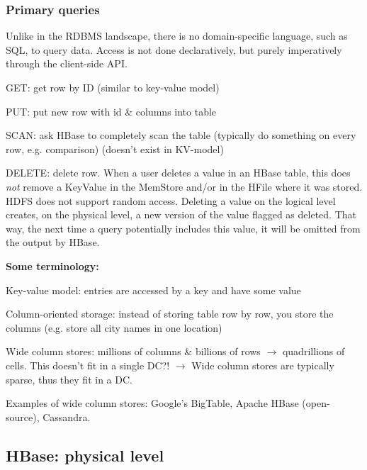 \documentclass[11pt,oneside,a4paper]{article}
\begin{document}
\subsubsection{Primary queries}

Unlike in the RDBMS landscape, there is no domain-specific language, such as SQL, to query data. Access is not done declaratively, but purely imperatively through the client-side API.

\begin{compactitem}
	\item GET: get row by ID (similar to key-value model)
	\item PUT: put new row with id \& columns into table
	\item SCAN: ask HBase to completely scan the table (typically do something on every row, e.g. comparison) (doesn't exist in KV-model)
	\item DELETE: delete row. When a user deletes a value in an HBase table, this does \textit{not} remove a KeyValue in the MemStore and/or in the HFile where it was stored. HDFS does not support random access. Deleting a value on the logical level creates, on the physical level, a new version of the value flagged as deleted. That way, the next time a query potentially includes this value, it will be omitted from the output by HBase.\\
\end{compactitem}

\textbf{Some terminology:}

\begin{compactitem}
	\item Key-value model: entries are accessed by a key and have some value
	\item Column-oriented storage: instead of storing table row by row, you store the columns (e.g. store all city names in one location)
	\item Wide column stores: millions of columns \& billions of rows $\rightarrow$ quadrillions of cells. This doesn't fit in a single DC?! $\rightarrow$ Wide column stores are typically sparse, thus they fit in a DC.
\end{compactitem}

Examples of wide column stores: Google's BigTable, Apache HBase (open-source), Cassandra.\\

\subsection{HBase: physical level}
\end{document}
